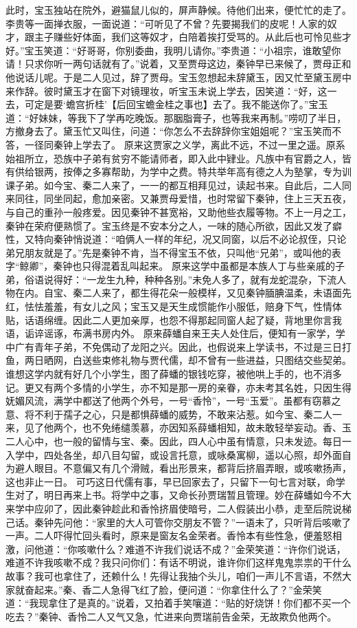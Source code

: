\documentclass[12pt,oneside]{book}
\begin{document}
此时，宝玉独站在院外，避猫鼠儿似的，屏声静候。待他们出来，便忙忙的走了。李贵等一面掸衣服，一面说道：“可听见了不曾？先要揭我们的皮呢！人家的奴才，跟主子赚些好体面，我们这等奴才，白陪着挨打受骂的。从此后也可怜见些才好。”宝玉笑道：“好哥哥，你别委曲，我明儿请你。”李贵道：“小祖宗，谁敢望你请！只求你听一两句话就有了。”说着，又至贾母这边，秦钟早已来候了，贾母正和他说话儿呢。于是二人见过，辞了贾母。宝玉忽想起未辞黛玉，因又忙至黛玉房中来作辞。彼时黛玉才在窗下对镜理妆，听宝玉未说上学去，因笑道：“好，这一去，可定是要‘蟾宫折桂’【后回宝蟾金桂之事也】去了。我不能送你了。”宝玉道：“好妹妹，等我下了学再吃晚饭。那胭脂膏子，也等我来再制。”唠叨了半日，方撤身去了。黛玉忙又叫住，问道：“你怎么不去辞辞你宝姐姐呢？”宝玉笑而不答，一径同秦钟上学去了。
原来这贾家之义学，离此不远，不过一里之遥。原系始祖所立，恐族中子弟有贫穷不能请师者，即入此中肄业。凡族中有官爵之人，皆有供给银两，按俸之多寡帮助，为学中之费。特共举年高有德之人为塾掌，专为训课子弟。如今宝、秦二人来了，一一的都互相拜见过，读起书来。自此后，二人同来同往，同坐同起，愈加亲密。又兼贾母爱惜，也时常留下秦钟，住上三天五夜，与自己的重孙一般疼爱。因见秦钟不甚宽裕，又助他些衣履等物。不上一月之工，秦钟在荣府便熟惯了。宝玉终是不安本分之人，一味的随心所欲，因此又发了癖性，又特向秦钟悄说道：“咱俩人一样的年纪，况又同窗，以后不必论叔侄，只论弟兄朋友就是了。”先是秦钟不肯，当不得宝玉不依，只叫他“兄弟”，或叫他的表字“鲸卿”，秦钟也只得混着乱叫起来。
原来这学中虽都是本族人丁与些亲戚的子弟，俗语说得好：“一龙生九种，种种各别。”未免人多了，就有龙蛇混杂，下流人物在内。自宝、秦二人来了，都生得花朵一般模样，又见秦钟腼腆温柔，未语面先红，怯怯羞羞，有女儿之风；宝玉又是天生成惯能作小服低，赔身下气，性情体贴，话语绵缠。因此二人更加亲厚，也怨不得那起同窗人起了疑，背地里你言我语，诟谇谣诼，布满书房内外。
原来薛蟠自来王夫人处住后，便知有一家学，学中广有青年子弟，不免偶动了龙阳之兴。因此，也假说来上学读书，不过是三日打鱼，两日晒网，白送些束修礼物与贾代儒，却不曾有一些进益，只图结交些契弟。谁想这学内就有好几个小学生，图了薛蟠的银钱吃穿，被他哄上手的，也不消多记。更又有两个多情的小学生，亦不知是那一房的亲眷，亦未考其名姓，只因生得妩媚风流，满学中都送了他两个外号，一号“香怜”，一号“玉爱”。虽都有窃慕之意、将不利于孺子之心，只是都惧薛蟠的威势，不敢来沾惹。如今宝、秦二人一来，见了他两个，也不免绻缱羡慕，亦因知系薛蟠相知，故未敢轻举妄动。香、玉二人心中，也一般的留情与宝、秦。因此，四人心中虽有情意，只未发迹。每日一入学中，四处各坐，却八目勾留，或设言托意，或咏桑寓柳，遥以心照，却外面自为避人眼目。不意偏又有几个滑贼，看出形景来，都背后挤眉弄眼，或咳嗽扬声，这也非止一日。
可巧这日代儒有事，早已回家去了，只留下一句七言对联，命学生对了，明日再来上书。将学中之事，又命长孙贾瑞暂且管理。妙在薛蟠如今不大来学中应卯了，因此秦钟趁此和香怜挤眉使暗号，二人假装出小恭，走至后院说梯己话。秦钟先问他：“家里的大人可管你交朋友不管？”一语未了，只听背后咳嗽了一声。二人吓得忙回头看时，原来是窗友名金荣者。香怜本有些性急，便羞怒相激，问他道：“你咳嗽什么？难道不许我们说话不成？”金荣笑道：“许你们说话，难道不许我咳嗽不成？我只问你们：有话不明说，谁许你们这样鬼鬼祟祟的干什么故事？我可也拿住了，还赖什么！先得让我抽个头儿，咱们一声儿不言语，不然大家就奋起来。”秦、香二人急得飞红了脸，便问道：“你拿住什么了？”金荣笑道：“我现拿住了是真的。”说着，又拍着手笑嚷道：“贴的好烧饼！你们都不买一个吃去？”秦钟、香怜二人又气又急，忙进来向贾瑞前告金荣，无故欺负他两个。
\end{document}
